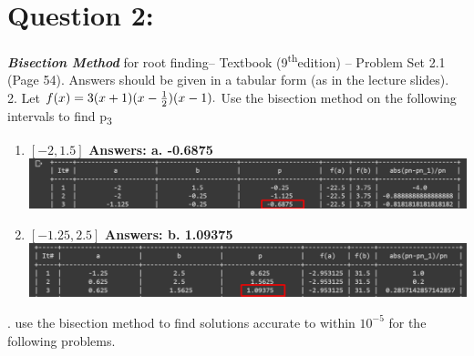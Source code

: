 \documentclass[a4paper,12pt]{article}
\begin{document}
\section*{\LARGE Question 2:}{ \LARGE \textbf{\emph {Bisection Method}}\Large { for root finding– Textbook (9\textsuperscript{th}edition) – Problem Set 2.1 (Page 54). Answers should be given in a tabular form (as in the lecture slides).}}\\[0.5cm]
2. Let $f(x) = 3(x+1)(x-{1 \over 2})(x-1).$ Use the bisection method on the following intervals to find p\textsubscript{3}\\
\begin{enumerate}[label=(\alph*)]
\item $\left[-2,1.5\right]$ \textbf{\qquad \qquad \qquad \qquad \qquad \qquad \quad  Answers: a. -0.6875}\\
\includegraphics[scale=0.78]{Q2 2.a.png}
\item $\left[-1.25,2.5\right]$ \textbf{\qquad \qquad \qquad \qquad \qquad \qquad \quad  Answers: b. 1.09375}\\
\includegraphics[scale=0.78]{Q2 2.b.png}
\end{enumerate}
. use the bisection method to find solutions accurate to within $10^{-5}$ for the following problems.
\end{document}
